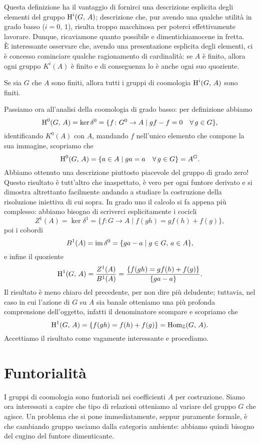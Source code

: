 Questa definizione ha il vantaggio di fornirci una descrizione esplicita degli elementi del gruppo $ \operatorname{H}^i(G, \, A) $; descrizione che, pur avendo una qualche utilità in grado basso ($ i = 0,\, 1 $), risulta troppo macchinosa per poterci effettivamente lavorare. Dunque, ricaviamone quanto possibile e dimentichiamocene in fretta. \\

È interessante osservare che, avendo una presentazione esplicita degli elementi, ci è concesso cominciare qualche ragionamento di cardinalità: se $ A $ è finito, allora ogni gruppo $ K^i(A) $ è finito e di conseguenza lo è anche ogni suo quoziente.
\begin{lemma}
	Se sia $ G $ che $ A $ sono finiti, allora tutti i gruppi di coomologia $ \operatorname{H}^i(G, \, A) $ sono finiti.
\end{lemma}

Passiamo ora all'analisi della coomologia di grado basso: per definizione abbiamo
$$  \operatorname{H}^0(G, \, A) = \ker \delta^0 = \{ f \colon G^0 \to A \mid gf-f = 0 \quad \forall \, g \in G \},  $$
identificando $ K^0(A) $ con $ A $, mandando $ f $ nell'unico elemento che compone la sua immagine, scopriamo che
\[ \operatorname{H}^0(G, \, A) = \{ a \in A \mid ga = a \quad \forall \, g \in G \} = A^G. \]
Abbiamo ottenuto una descrizione piuttosto piacevole del gruppo di grado zero! Questo risultato è tutt'altro che inaspettato, è vero per ogni funtore derivato e si dimostra altrettanto facilmente andando a studiare la costruzione della risoluzione iniettiva di cui sopra. In grado uno il calcolo si fa appena più complesso: abbiamo bisogno di scriverci esplicitamente i cocicli
\[ Z^1(A) = \ker \delta^1 = \{ f \colon G \to A \mid f(gh) = gf(h) + f(g) \}, \]
poi i cobordi
\[ B^1(A) = \operatorname{im} \delta^0 = \{ ga - a \mid g \in G, \, a \in A  \}, \]
e infine il quoziente
\[ \operatorname{H}^1(G, \, A) = \frac{Z^1(A)}{B^1(A)} = \frac{\{ f(gh) = gf(h) + f(g) \}}{\{ ga - a\}}. \]
Il risultato è meno chiaro del precedente, per non dire più deludente; tuttavia, nel caso in cui l'azione di $ G $ su $ A $ sia banale otteniamo una più profonda comprensione dell'oggetto, infatti il denominatore scompare e scopriamo che
\[ \operatorname{H}^1(G, \, A) = \{ f(gh) = f(h) + f(g) \} = \operatorname{Hom}_{\mathbb{Z}}(G, \, A). \]
Accettiamo il risultato come vagamente interessante e procediamo.

\section{Funtorialità}
I gruppi di coomologia sono funtoriali nei coefficienti $ A $ per costruzione. Siamo ora interessati a capire che tipo di relazioni otteniamo al variare del gruppo $ G $ che agisce. Un problema che si pone immediatamente, seppur puramente formale, è che cambiando gruppo usciamo dalla categoria ambiente: abbiamo quindi bisogno del cugino del funtore dimenticante.

